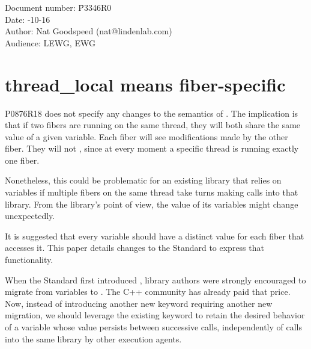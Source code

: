 \documentclass[fontsize=10pt,paper=A4,pagesize,DIV=15]{scrartcl}
\begin{document}
\small
\begin{tabbing}
    Document number: \= P3346R0\\
    Date:            -10-16\\
    Author:          \> Nat Goodspeed (nat@lindenlab.com)\\
    Audience:        \> LEWG, EWG\\
\end{tabbing}

\section*{thread\_local means fiber-specific}


\tableofcontents


\label{abstract}

P0876R18\cite{P0876R18} does not specify any changes to the semantics of
. The implication is that
if two fibers are running on the same thread, they will both share the same
value of a given \tlocal variable. Each fiber will see modifications made by
the other fiber. They will not , since at every
moment a specific thread is running exactly one fiber.

Nonetheless, this could be problematic for an existing library that relies on
\tlocal variables if multiple fibers on the same thread take turns making
calls into that library. From the library's point of view, the value of its
\tlocal variables might change unexpectedly.

It is suggested that every \tlocal variable should have a distinct value for
each fiber that accesses it. This paper details changes to the
Standard\cite{Standard} to express that functionality. 

When the Standard first introduced \tlocal, library authors were strongly
encouraged to migrate from  variables to \tlocal. The C++
community has already paid that price. Now, instead of introducing another new
keyword requiring another new migration, we should leverage the existing
keyword to retain the desired behavior of a variable whose value persists
between successive calls, independently of calls into the same library by
other execution agents.
\end{document}
